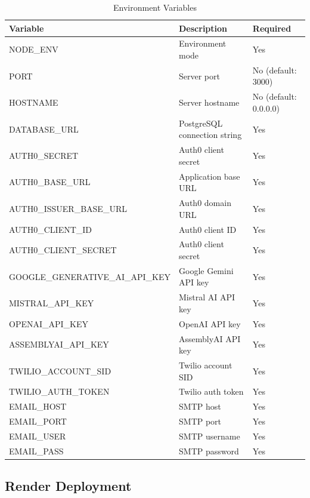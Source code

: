 \documentclass[12pt,a4paper]{article}
\begin{document}
\begin{table}[H]
\centering
\caption{Environment Variables}
\label{tab:env-vars}
\scriptsize
\begin{tabular}{@{}>{\raggedright\arraybackslash}p{4.4cm}>{\raggedright\arraybackslash}p{8.0cm}>{\raggedright\arraybackslash}p{1.6cm}@{}}
\toprule
\textbf{Variable} & \textbf{Description} & \textbf{Required} \\
\midrule
NODE\_ENV & Environment mode & Yes \\
PORT & Server port & No (default: 3000) \\
HOSTNAME & Server hostname & No (default: 0.0.0.0) \\
DATABASE\_URL & PostgreSQL connection string & Yes \\
AUTH0\_SECRET & Auth0 client secret & Yes \\
AUTH0\_BASE\_URL & Application base URL & Yes \\
AUTH0\_ISSUER\_BASE\_URL & Auth0 domain URL & Yes \\
AUTH0\_CLIENT\_ID & Auth0 client ID & Yes \\
AUTH0\_CLIENT\_SECRET & Auth0 client secret & Yes \\
GOOGLE\_\allowbreak{}GENERATIVE\_\allowbreak{}AI\_\allowbreak{}API\_\allowbreak{}KEY & Google Gemini API key & Yes \\
MISTRAL\_API\_KEY & Mistral AI API key & Yes \\
OPENAI\_API\_KEY & OpenAI API key & Yes \\
ASSEMBLYAI\_API\_KEY & AssemblyAI API key & Yes \\
TWILIO\_ACCOUNT\_SID & Twilio account SID & Yes \\
TWILIO\_AUTH\_TOKEN & Twilio auth token & Yes \\
EMAIL\_HOST & SMTP host & Yes \\
EMAIL\_PORT & SMTP port & Yes \\
EMAIL\_USER & SMTP username & Yes \\
EMAIL\_PASS & SMTP password & Yes \\
\bottomrule
\end{tabular}
\normalsize
\end{table}

\subsection{Render Deployment}
\end{document}
